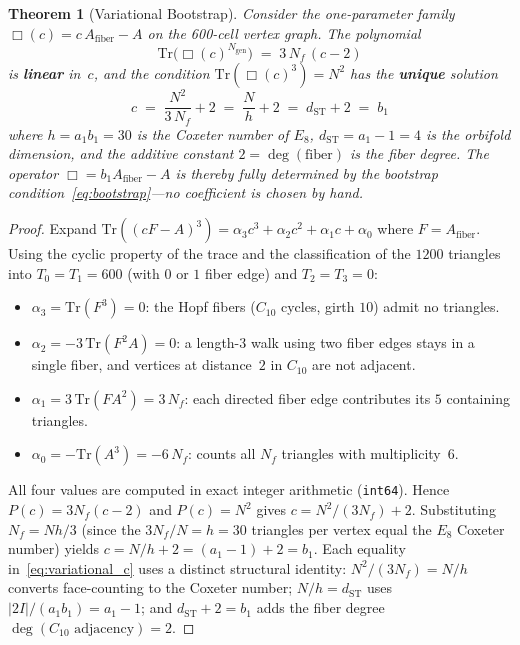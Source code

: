 \documentclass[12pt,a4paper]{article}
\newtheorem{theorem}{Theorem}
\theoremstyle{definition}
\begin{document}
\begin{theorem}[Variational Bootstrap]\label{thm:variational_bootstrap}
Consider the one-parameter family $\Box(c) = c\, A_{\mathrm{fiber}} - A$ on the 600-cell vertex graph.  The polynomial
\begin{equation}
\mathrm{Tr}\!\big(\Box(c)^{N_{\mathrm{gen}}}\big) \;=\; 3\,N_f\,(c - 2)
\label{eq:variational_linear}
\end{equation}
is \textbf{linear} in~$c$, and the condition $\mathrm{Tr}(\Box(c)^3) = N^2$ has the \textbf{unique} solution
\begin{equation}
\boxed{c \;=\; \frac{N^2}{3\,N_f} + 2 \;=\; \frac{N}{h} + 2 \;=\; d_{\mathrm{ST}} + 2 \;=\; b_1}
\label{eq:variational_c}
\end{equation}
where $h = a_1 b_1 = 30$ is the Coxeter number of $E_8$, $d_{\mathrm{ST}} = a_1 - 1 = 4$ is the orbifold dimension, and the additive constant $2 = \deg(\text{fiber})$ is the fiber degree.  The operator $\Box = b_1 A_{\mathrm{fiber}} - A$ is thereby fully determined by the bootstrap condition~\eqref{eq:bootstrap}---no coefficient is chosen by hand.
\end{theorem}

\begin{proof}
Expand $\mathrm{Tr}((cF - A)^3) = \alpha_3 c^3 + \alpha_2 c^2 + \alpha_1 c + \alpha_0$ where $F = A_{\mathrm{fiber}}$.  Using the cyclic property of the trace and the classification of the $1200$ triangles into $T_0 = T_1 = 600$ (with $0$ or $1$ fiber edge) and $T_2 = T_3 = 0$:
\begin{itemize}
\item $\alpha_3 = \mathrm{Tr}(F^3) = 0$: the Hopf fibers ($C_{10}$ cycles, girth $10$) admit no triangles.
\item $\alpha_2 = -3\,\mathrm{Tr}(F^2 A) = 0$: a length-$3$ walk using two fiber edges stays in a single fiber, and vertices at distance~$2$ in $C_{10}$ are not adjacent.
\item $\alpha_1 = 3\,\mathrm{Tr}(F A^2) = 3\,N_f$: each directed fiber edge contributes its $5$ containing triangles.
\item $\alpha_0 = -\mathrm{Tr}(A^3) = -6\,N_f$: counts all $N_f$ triangles with multiplicity~$6$.
\end{itemize}
All four values are computed in exact integer arithmetic (\texttt{int64}).  Hence $P(c) = 3N_f(c-2)$ and $P(c) = N^2$ gives $c = N^2/(3N_f) + 2$.  Substituting $N_f = N h/3$ (since the $3N_f/N = h = 30$ triangles per vertex equal the $E_8$ Coxeter number) yields $c = N/h + 2 = (a_1 - 1) + 2 = b_1$.  Each equality in~\eqref{eq:variational_c} uses a distinct structural identity: $N^2/(3N_f) = N/h$ converts face-counting to the Coxeter number; $N/h = d_{\mathrm{ST}}$ uses $|2I|/(a_1 b_1) = a_1 - 1$; and $d_{\mathrm{ST}} + 2 = b_1$ adds the fiber degree $\deg(C_{10}\text{ adjacency}) = 2$.
\end{proof}
\end{document}
